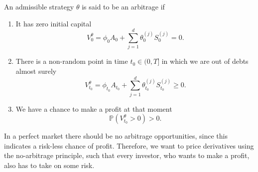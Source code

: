 \begin{defn}
    An admissible strategy $\theta$ is said to be an arbitrage if
    \begin{enumerate}
        \item It has zero initial capital
        \begin{equation}
            V_{0}^{\theta}=\phi_{0}A_{0}+\sum_{j=1}^{d}\theta_{0}^{(j)}S_{0}^{(j)}=0.
        \end{equation}
        \item There is a non-random point in time $t_{0}\in (0,T]$ in which we are out of debts almost surely
        \begin{equation}
            V_{t_{0}}^{\theta}=\phi_{t_{0}}A_{t_{0}}+\sum_{j=1}^{d}\theta_{t_{0}}^{(j)}S_{t_{0}}^{(j)}\geq 0.
        \end{equation}
        \item We have a chance to make a profit at that moment
        \begin{equation}
            \mathbb{P}\left(V_{t_{0}}^{\theta}>0\right)>0.
        \end{equation}
    \end{enumerate}
\end{defn}
In a perfect market there should be no arbitrage opportunities, since this indicates a risk-less chance of profit. Therefore, we want to price derivatives using the no-arbitrage principle, such that every investor, who wants to make a profit, also has to take on some risk. 

